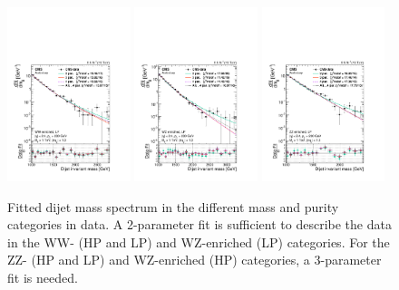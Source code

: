 \begin{figure}[h!]
\includegraphics[width=0.32\textwidth]{figures/analysis/search1/AN-15-211/ftest/no5par/WWLP_fitComp.pdf}
\includegraphics[width=0.32\textwidth]{figures/analysis/search1/AN-15-211/ftest/no5par/WZLP_fitComp.pdf}
\includegraphics[width=0.32\textwidth]{figures/analysis/search1/AN-15-211/ftest/no5par/ZZLP_fitComp.pdf}
\caption{Fitted dijet mass spectrum in the different mass and purity categories in data. A 2-parameter fit is sufficient to describe the data in the WW- (HP and LP) and WZ-enriched (LP) categories. For the ZZ- (HP and LP) and WZ-enriched (HP) categories, a 3-parameter fit is needed.}
\label{fig:searchI:fit-dataVV}
\end{figure}
